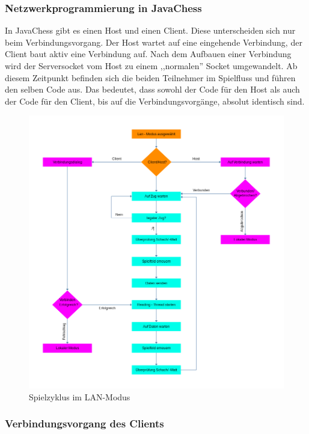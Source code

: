 \documentclass[12pt,a4paper]{article}
\begin{document}
\subsubsection{Netzwerkprogrammierung in JavaChess}
\label{SUBSUBSEC:NETWORKJC}

In JavaChess gibt es einen Host und einen Client. Diese unterscheiden sich nur beim Verbindungsvorgang. Der Host wartet auf eine eingehende Verbindung, der Client baut aktiv eine Verbindung auf. Nach dem Aufbauen einer Verbindung wird der Serversocket vom Host zu einem ,,normalen'' Socket umgewandelt. Ab diesem Zeitpunkt befinden sich die beiden Teilnehmer im Spielfluss und führen den selben Code aus. Das bedeutet, dass sowohl der Code für den Host als auch der Code für den Client, bis auf die Verbindungsvorgänge, absolut identisch sind. 


\begin{figure}[H]
  \centering
   	\includegraphics[width=16cm]{graphics/SpielflussLAN.png}
  \caption{Spielzyklus im LAN-Modus}
  \label{fig:lan}
\end{figure}


\subsubsection{Verbindungsvorgang des Clients}
\label{SUBSUBSEC:CONCLI}
\end{document}
